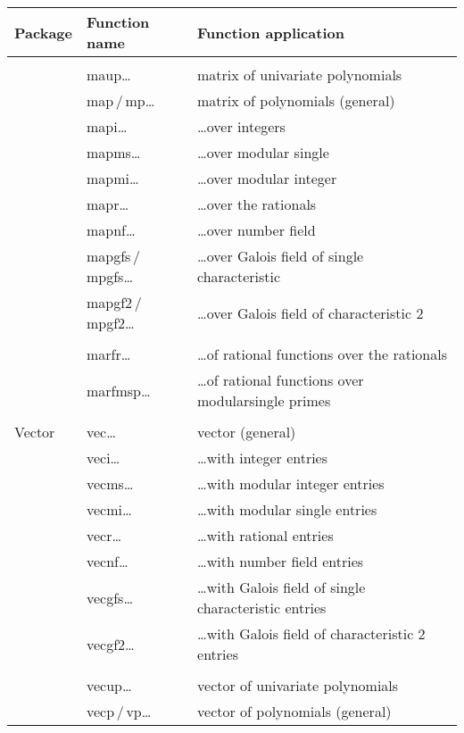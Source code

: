 \begin{tabular}{p{1.0in}p{1.3in}p{3.0in}}
 Package     & Function name & Function application \\ \hline
                   &               & \\
                   & maup\ldots    & matrix of univariate polynomials\\
                   & map\,/\,mp\ldots & matrix of polynomials (general) \\ 

                   & mapi\ldots    & \ldots over integers\\
                   & mapms\ldots   & \ldots over modular single\\
                   & mapmi\ldots   & \ldots over modular integer\\
                   & mapr\ldots    & \ldots over the rationals\\
                   & mapnf\ldots   & \ldots over number field\\
                   & mapgfs\,/\,mpgfs\ldots & \ldots over Galois field of single characteristic\\
                   & mapgf2\,/\,mpgf2\ldots & \ldots over Galois field of characteristic 2\\
                   &               & \\
                   & marfr\ldots   & \ldots of rational functions over the rationals\\
                   & marfmsp\ldots & \ldots of rational functions over modular\newline single primes\\
                   &               & \\
 Vector            & vec\ldots     & vector (general)\\
                   & veci\ldots    & \ldots with integer entries\\
                   & vecms\ldots   & \ldots with modular integer entries\\
                   & vecmi\ldots   & \ldots with modular single entries\\
                   & vecr\ldots    & \ldots with rational entries\\
                   & vecnf\ldots   & \ldots with number field entries\\
                   & vecgfs\ldots  & \ldots with Galois field of single characteristic entries\\
                   & vecgf2\ldots  & \ldots with Galois field of characteristic 2 entries \\
                   &               & \\
                   & vecup\ldots   & vector of univariate polynomials\\
                   & vecp\,/\,vp\ldots & vector of polynomials (general) \\ 


\end{tabular}
